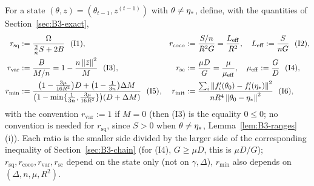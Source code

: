 \begin{definition}\label{def:B3-ratios}
For a state $(\theta,z)=(\theta_{t-1},z^{(t-1)})$ with $\theta\ne\eta_\ast$, define, with the quantities of Section~\ref{sec:B3-exact},
\begin{align*}
r_{\mathrm{sq}}&:=\frac{\Omega}{\frac2nS+2B}\ \ \text{(I1)}, &
r_{\mathrm{coco}}&:=\frac{S/n}{R^2G}=\frac{\LEff}{R^2},\quad \LEff:=\frac{S}{nG}\ \ \text{(I2)},\\
r_{\mathrm{var}}&:=\frac{B}{M/n}=1-\frac{n\norm{\bar z}^2}{M}\ \ \text{(I3)}, &
r_{\mathrm{sc}}&:=\frac{\mu D}{G}=\frac{\mu}{\muEff},\quad \muEff:=\frac GD\ \ \text{(I4)},\\
r_{\min}&:=\frac{\big(1-\frac{3\mu}{16R^2}\big)D+\big(1-\frac1{3n}\big)\Delta M}{\big(1-\min\{\frac1{3n},\frac{3\mu}{16R^2}\}\big)(D+\Delta M)}\ \ \text{(I5)}, &
r_{\mathrm{init}}&:=\frac{\sum_i\norm{\fip(\theta_0)-\fip(\etastar)}^2}{nR^4\norm{\theta_0-\etastar}^2}\ \ \text{(I6)},
\end{align*}
with the convention $r_{\mathrm{var}}:=1$ if $M=0$ (then (I3) is the equality $0\le0$; no convention is needed for $r_{\mathrm{sq}}$, since $S>0$ when $\theta\ne\eta_\ast$, Lemma~\ref{lem:B3-ranges}(i)). Each ratio is the smaller side divided by the larger side of the corresponding inequality of Section~\ref{sec:B3-chain} (for (I4), $G\ge\mu D$, this is $\mu D/G$); $r_{\mathrm{sq}},r_{\mathrm{coco}},r_{\mathrm{var}},r_{\mathrm{sc}}$ depend on the state only (not on $\gamma,\Delta$), $r_{\min}$ also depends on $(\Delta,n,\mu,R^2)$.
\end{definition}


